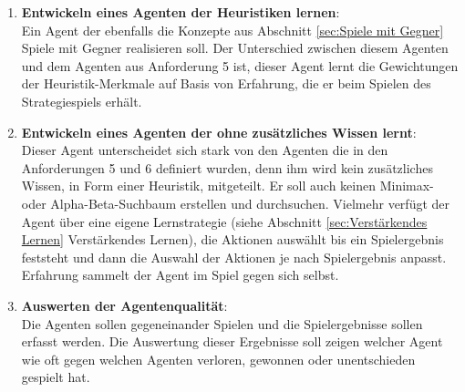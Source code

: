 \begin{enumerate}
\item \textbf{Entwickeln eines Agenten der Heuristiken lernen}: \\
Ein Agent der ebenfalls die Konzepte aus Abschnitt \ref{sec:Spiele mit Gegner} Spiele mit Gegner realisieren soll. Der Unterschied zwischen diesem Agenten und dem Agenten aus Anforderung 5 ist, dieser Agent lernt die Gewichtungen der Heuristik-Merkmale auf Basis von Erfahrung, die er beim Spielen des Strategiespiels erhält.
	
\item \textbf{Entwickeln eines Agenten der ohne zusätzliches Wissen lernt}: \\
Dieser Agent unterscheidet sich stark von den Agenten die in den Anforderungen 5 und 6 definiert wurden, denn ihm wird kein zusätzliches Wissen, in Form einer Heuristik, mitgeteilt. Er soll auch keinen Minimax- oder Alpha-Beta-Suchbaum erstellen und durchsuchen. Vielmehr verfügt der Agent über eine eigene Lernstrategie (siehe Abschnitt \ref{sec:Verstärkendes Lernen} Verstärkendes Lernen), die Aktionen auswählt bis ein Spielergebnis feststeht und dann die Auswahl der Aktionen je nach Spielergebnis anpasst. Erfahrung sammelt der Agent im Spiel gegen sich selbst.
	
\item \textbf{Auswerten der Agentenqualität}: \\
Die Agenten sollen gegeneinander Spielen und die Spielergebnisse sollen erfasst werden. Die Auswertung dieser Ergebnisse soll zeigen welcher Agent wie oft gegen welchen Agenten verloren, gewonnen oder unentschieden gespielt hat. 
\end{enumerate}

